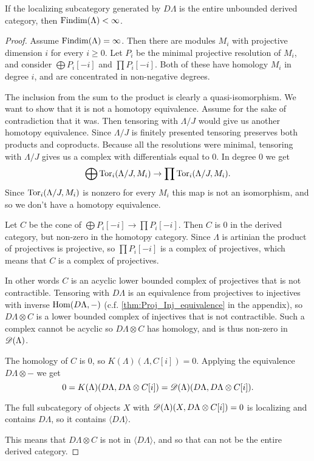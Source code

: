 \begin{theorem}\cite[Theorem~4.3]{Rick19}\label{thm:injectives_generate_implies_FDC}
	If the localizing subcategory generated by $D\Lambda$ is the entire unbounded derived category, then $\operatorname{Findim}(\Lambda) < \infty$.
	\begin{proof}
		Assume $\operatorname{Findim}(\Lambda) = \infty$. Then there are modules $M_i$ with projective dimension $i$ for every $i \geq 0$. Let $P_i$ be the minimal projective resolution of $M_i$, and consider $\bigoplus P_i[-i]$ and $\prod P_i[-i]$. Both of these have homology $M_i$ in degree $i$, and are concentrated in non-negative degrees.
		
		The inclusion from the sum to the product is clearly a quasi-isomorphism. We want to show that it is not a homotopy equivalence. Assume for the sake of contradiction that it was. Then tensoring with $\Lambda/J$ would give us another homotopy equivalence. Since $\Lambda/J$ is finitely presented tensoring preserves both products and coproducts. Because all the resolutions were minimal, tensoring with $\Lambda/J$ gives us a complex with differentials equal to 0. In degree 0 we get $$\bigoplus \operatorname{Tor}_i(\Lambda/J, M_i) \to \prod \operatorname{Tor}_i(\Lambda/J, M_i) .$$
		Since $\operatorname{Tor}_i(\Lambda/J, M_i)$ is nonzero for every $M_i$ this map is not an isomorphism, and so we don't have a homotopy equivalence.
		
		Let $C$ be the cone of $\bigoplus P_i[-i] \to \prod P_i[-i]$. Then $C$ is 0 in the derived category, but non-zero in the homotopy category. Since $\Lambda$ is artinian the product of projectives is projective\cite[Theorem~3.3]{Chase60}, so $\prod P_i[-i]$ is a complex of projectives, which means that $C$ is a complex of projectives. 
		
		In other words $C$ is an acyclic lower bounded complex of projectives that is not contractible. Tensoring with $D\Lambda$ is an equivalence from projectives to injectives with inverse $\operatorname{Hom}(D\Lambda, -)$ (c.f. \cref{thm:Proj_Inj_equivalence} in the appendix), so $D\Lambda \otimes C$ is a lower bounded complex of injectives that is not contractible. Such a complex cannot be acyclic so $D\Lambda \otimes C$ has homology, and is thus non-zero in $\operatorname{\mathscr{D}}(\Lambda)$.
		
		The homology of $C$ is 0, so $K(\Lambda)(\Lambda, C[i]) = 0$. Applying the equivalence $D\Lambda \otimes -$ we get 
		$$0=K(\Lambda)(D\Lambda, D\Lambda \otimes C [i])=\operatorname{\mathscr{D}}(\Lambda)(D\Lambda, D\Lambda \otimes C [i]).$$ 
		
		The full subcategory of objects $X$ with $\operatorname{\mathscr{D}}(\Lambda)(X, D\Lambda \otimes C [i]) = 0$ is localizing and contains $D\Lambda$, so it contains $\langle D\Lambda \rangle$.
		
		This means that $D\Lambda \otimes C$ is not in $\langle D\Lambda \rangle$, and so that can not be the entire derived category.
	\end{proof}
\end{theorem}

